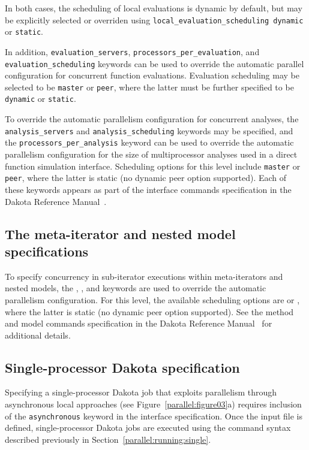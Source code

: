 In both cases, the scheduling of local evaluations is dynamic by
default, but may be explicitly selected or overriden using
\texttt{local\_evaluation\_scheduling dynamic} or \texttt{static}.

In addition, \texttt{evaluation\_servers},
\texttt{processors\_per\_evaluation}, and
\texttt{evaluation\_scheduling} keywords can be used to override the
automatic parallel configuration for concurrent function
evaluations. Evaluation scheduling may be selected to be
\texttt{master} or \texttt{peer}, where the latter must be further
specified to be \texttt{dynamic} or \texttt{static}. 

To override the automatic parallelism configuration for concurrent
analyses, the \texttt{analysis\_servers} and
\texttt{analysis\_scheduling} keywords may be specified, and the
\texttt{processors\_per\_analysis} keyword can be used to override the
automatic parallelism configuration for the size of multiprocessor
analyses used in a direct function simulation interface. Scheduling
options for this level include \texttt{master} or \texttt{peer}, where
the latter is static (no dynamic peer option supported).  Each of
these keywords appears as part of the interface commands specification
in the Dakota Reference Manual~\cite{RefMan}.

\subsection{The meta-iterator and nested model specifications}\label{parallel:spec:meta}

To specify concurrency in sub-iterator executions within
meta-iterators and nested models, the ,
, and 
keywords are used to override the automatic parallelism configuration.
For this level, the available scheduling options are 
or , where the latter is static (no dynamic peer option
supported).  See the method and model commands specification in the
Dakota Reference Manual~\cite{RefMan} for additional details.

\subsection{Single-processor Dakota specification}\label{parallel:spec:single}

Specifying a single-processor Dakota job that exploits parallelism
through asynchronous local approaches (see
Figure~\ref{parallel:figure03}a) requires inclusion of the
\texttt{asynchronous} keyword in the interface specification. Once the
input file is defined, single-processor Dakota jobs are executed using
the command syntax described previously in
Section~\ref{parallel:running:single}.

